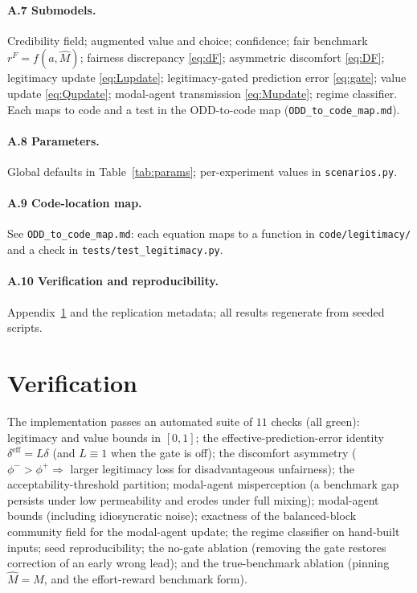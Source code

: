 \documentclass[11pt]{article}
\newcommand{\1}{\mathbf{1}}
\begin{document}
\paragraph{A.7 Submodels.} Credibility field; augmented value and choice;
confidence; fair benchmark $r^F=f(a,\hat M)$; fairness discrepancy
\eqref{eq:dF}; asymmetric discomfort \eqref{eq:DF}; legitimacy update
\eqref{eq:Lupdate}; legitimacy-gated prediction error \eqref{eq:gate}; value
update \eqref{eq:Qupdate}; modal-agent transmission \eqref{eq:Mupdate}; regime
classifier. Each maps to code and a test in the ODD-to-code map
(\texttt{ODD\_to\_code\_map.md}).

\paragraph{A.8 Parameters.} Global defaults in Table~\ref{tab:params};
per-experiment values in \texttt{scenarios.py}.

\paragraph{A.9 Code-location map.} See \texttt{ODD\_to\_code\_map.md}: each
equation maps to a function in \texttt{code/legitimacy/} and a check in
\texttt{tests/test\_legitimacy.py}.

\paragraph{A.10 Verification and reproducibility.} Appendix~\ref{app:tests} and
the replication metadata; all results regenerate from seeded scripts.

\section{Verification}
\label{app:tests}
The implementation passes an automated suite of $11$ checks (all green):
legitimacy and value bounds in $[0,1]$; the effective-prediction-error identity
$\delta^{\mathrm{eff}}=L\delta$ (and $L\equiv1$ when the gate is off); the
discomfort asymmetry ($\phi^->\phi^+\Rightarrow$ larger legitimacy loss for
disadvantageous unfairness); the acceptability-threshold partition; modal-agent
misperception (a benchmark gap persists under low permeability and erodes under
full mixing); modal-agent bounds (including idiosyncratic noise); exactness of
the balanced-block community field for the modal-agent update; the regime
classifier on hand-built inputs; seed reproducibility; the no-gate ablation
(removing the gate restores correction of an early wrong lead); and the
true-benchmark ablation (pinning $\hat M=M$, and the effort-reward benchmark
form).
\end{document}
